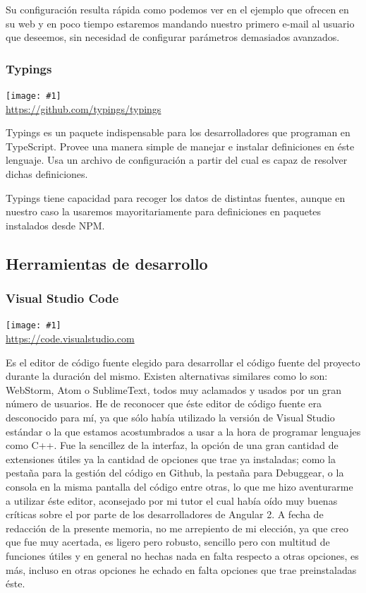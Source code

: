 \documentclass[11pt,openany]{book}
\newcommand{\logo}[2]{\medskip\begin{center}\texttt{[image: \#1]}\\\scriptsize\url{#2}\end{center}\bigskip}
\begin{document}
Su configuración resulta rápida como podemos ver en el ejemplo que ofrecen en su web y en poco tiempo estaremos mandando nuestro primero e-mail al usuario que deseemos, sin necesidad de configurar parámetros demasiados avanzados.

\subsubsection{Typings}

\logo{logos/typings.png}{https://github.com/typings/typings}

Typings es un paquete indispensable para los desarrolladores que programan en TypeScript. Provee una manera simple de manejar e instalar definiciones en éste lenguaje. Usa un archivo de configuración a partir del cual es capaz de resolver dichas definiciones.

Typings tiene capacidad para recoger los datos de distintas fuentes, aunque en nuestro caso la usaremos mayoritariamente para definiciones en paquetes instalados desde NPM.

\subsection{Herramientas de desarrollo}

\subsubsection{Visual Studio Code}

\logo{logos/vscode.png}{https://code.visualstudio.com}

Es el editor de código fuente elegido para desarrollar el código fuente del proyecto durante la duración del mismo. Existen alternativas similares como lo son: WebStorm, Atom o SublimeText, todos muy aclamados y usados por un gran número de usuarios. He de reconocer que éste editor de código fuente era desconocido para mí, ya que sólo había utilizado la versión de Visual Studio estándar o la que estamos acostumbrados a usar a la hora de programar lenguajes como C++. Fue la sencillez de la interfaz, la opción de una gran cantidad de extensiones útiles ya la cantidad de opciones que trae ya instaladas; como la pestaña para la gestión del código en Github, la pestaña para Debuggear, o la consola en la misma pantalla del código entre otras, lo que me hizo aventurarme a utilizar éste editor, aconsejado por mi tutor el cual había oído muy buenas críticas sobre el por parte de los desarrolladores de Angular 2. A fecha de redacción de la presente memoria, no me arrepiento de mi elección, ya que creo que fue muy acertada, es ligero pero robusto, sencillo pero con multitud de funciones útiles y en general no hechas nada en falta respecto a otras opciones, es más, incluso en otras opciones he echado en falta opciones que trae preinstaladas éste.
\end{document}
